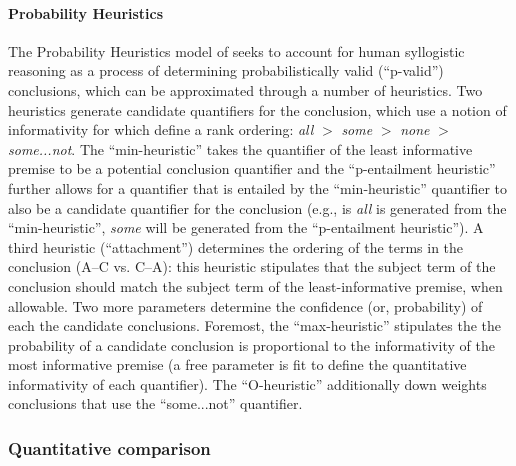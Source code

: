 \documentclass[floatsintext, doc]{apa6}
\begin{document}
\paragraph{Probability Heuristics} 

The Probability Heuristics model of  seeks to account for human syllogistic reasoning as a process of determining probabilistically valid (``p-valid'') conclusions, which can be approximated through a number of heuristics. 
Two heuristics generate candidate quantifiers for the conclusion, which use a notion of informativity for which  define a rank ordering: \emph{all} $>$ \emph{some} $>$ \emph{none} $>$ \emph{some...not}.  
The ``min-heuristic'' takes the quantifier of the least informative premise to be a potential conclusion quantifier and the ``p-entailment heuristic'' further allows for a quantifier that is entailed by the ``min-heuristic'' quantifier to also be a candidate quantifier for the conclusion (e.g., is \emph{all} is generated from the ``min-heuristic'', \emph{some} will be generated from the ``p-entailment heuristic''). 
A third heuristic (``attachment'') determines the ordering of the terms in the conclusion (A--C vs. C--A): this heuristic stipulates that the subject term of the conclusion should match the subject term of the least-informative premise, when allowable. 
Two more parameters determine the confidence (or, probability) of each the candidate conclusions. 
Foremost, the ``max-heuristic'' stipulates the the probability of a candidate conclusion is proportional to the informativity of the most informative premise (a free parameter is fit to define the quantitative informativity of each quantifier). 
The ``O-heuristic'' additionally down weights conclusions that use the ``some...not'' quantifier.

\subsubsection{Quantitative comparison}
\end{document}

